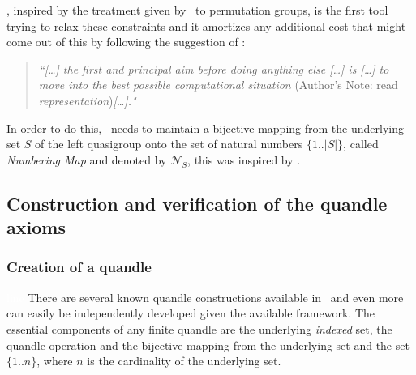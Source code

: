 \documentclass{mcom-l}
\begin{document}
\Software, inspired by the treatment given by \magma~to permutation groups, is the first tool trying to relax these constraints and it amortizes any additional cost that might come out of this by following the suggestion of \cite{holt2005handbook}: 

\begin{quote}
    \emph{``[\dots] the first and principal aim before doing anything else [\dots] is [\dots] to move into the best possible computational situation} (Author's Note: read \emph{representation})\emph{[\dots]."}
\end{quote}
In order to do this, \Software~needs to maintain a bijective mapping from the underlying set $S$ of the left quasigroup onto the set of natural numbers $\{1 .. |S|\}$, called \emph{Numbering Map} and denoted by $\mathcal{N}_S$, this was inspired by \magma.



\subsection{Construction and verification of the quandle axioms}
\subsubsection{Creation of a quandle}\textcolor{white}{line}\newline
There are several known quandle constructions available in \Software~and even more can easily be independently developed given the available framework. The essential components of any finite quandle are the underlying \emph{indexed} set, the quandle operation and the bijective mapping from the underlying set and the set $\{1..n\}$, where $n$ is the cardinality of the underlying set. \newline\newline
\end{document}
